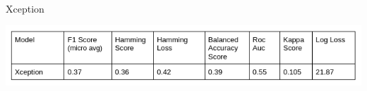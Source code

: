 \documentclass[sigconf]{acmart}
\begin{document}
\
\begin{table}[h] 

  \centering
  \caption{Xception}
  \includegraphics[width=\linewidth]{../supplements/xception.png}
 
  \label{Tab.1}
\end{table}
\\









\end{document}

